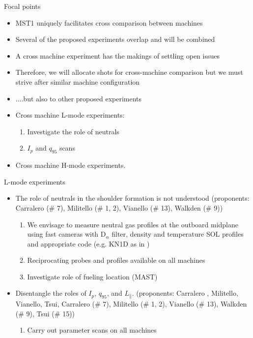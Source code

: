 \documentclass[10pt, compress]{beamer}
\begin{document}
\begin{frame}{Focal points}
\begin{itemize}
	\item MST1 uniquely facilitates cross comparison between machines
	\item Several of the proposed experiments overlap and will be combined
	\item A cross machine experiment has the makings of settling open issues
	\item Therefore, we will allocate shots for cross-machine
          comparison but we must strive after similar machine configuration
	\item ....but also to other proposed experiments
	\item Cross machine L-mode experiments: 
	\begin{enumerate}
		\item Investigate the role of neutrals 
		\item $I_p$ and $q_{95}$ scans
	\end{enumerate}
	\item Cross machine H-mode experiments. 
\end{itemize}	
\end{frame}

\begin{frame}{L-mode experiments}
	\begin{itemize}
		\item The role of neutrals in the shoulder
                  formation is not understood
                  {\scriptsize(proponents: Carralero (\# 7), Militello
                    (\# 1, 2), Vianello (\# 13), Walkden (\# 9))}
		\begin{enumerate}
		\item We envisage to measure neutral gas profiles at the outboard midplane
                  using fast cameras with D$_{\alpha}$ filter, density
                  and temperature SOL profiles and appropriate code
                  (e.g. KN1D as in \parencite{Lipschultz:2005gg,Lipschultz:2016vk})
		\item Reciprocating probes and profiles available on
                  all machines
                \item Investigate role of fueling location (MAST)
		\end{enumerate}
		\item Disentangle the roles of $I_p$, $q_{95}$, and $L_{\|}$.
                  {\scriptsize(proponents: Carralero , Militello, Vianello, Tsui, Carralero (\# 7), Militello
                    (\# 1, 2), Vianello (\# 13), Walkden (\# 9), Tsui
                    (\# 15))}
		\begin{enumerate}
			\item Carry out parameter scans on all machines
			
		\end{enumerate}
	\end{itemize}
\end{frame}
\end{document}
